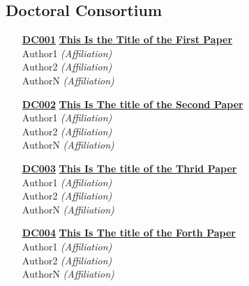 \subsection{Doctoral Consortium}
\begin{enumerate}
\item[\href{https://doi.org/10.1145/1122445.1122456}{\textbf{DC001}}]
\href{https://doi.org/10.1145/1122445.1122456}{\textbf{This Is the Title of the First Paper}}\\
Author1 \emph{(Affiliation)}\\
Author2 \emph{(Affiliation)}\\
AuthorN \emph{(Affiliation)}\\

\item[\href{https://doi.org/10.1145/1122445.1122456}{\textbf{DC002}}]
\href{https://doi.org/10.1145/1122445.1122456}{\textbf{This Is The title of the Second Paper}}\\
Author1 \emph{(Affiliation)}\\
Author2 \emph{(Affiliation)}\\
AuthorN \emph{(Affiliation)}\\

\item[\href{https://doi.org/10.1145/1122445.1122456}{\textbf{DC003}}]
\href{https://doi.org/10.1145/1122445.1122456}{\textbf{This Is The title of the Thrid Paper}}\\
Author1 \emph{(Affiliation)}\\
Author2 \emph{(Affiliation)}\\
AuthorN \emph{(Affiliation)}\\

\item[\href{https://doi.org/10.1145/1122445.1122456}{\textbf{DC004}}]
\href{https://doi.org/10.1145/1122445.1122456}{\textbf{This Is The title of the Forth Paper}}\\
Author1 \emph{(Affiliation)}\\
Author2 \emph{(Affiliation)}\\
AuthorN \emph{(Affiliation)}\\
\end{enumerate}


